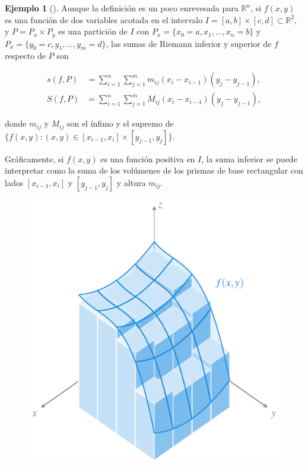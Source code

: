 \documentclass[
  a4paper,
]{scrreport}
\theoremstyle{definition}
\newtheorem{example}{Ejemplo}[chapter]
\theoremstyle{plain}
\theoremstyle{definition}
\theoremstyle{definition}
\theoremstyle{plain}
\theoremstyle{plain}
\theoremstyle{remark}
\begin{document}
\begin{example}[]
Aunque la definición es un poco enrevesada para \(\mathbb{R}^n\), si
\(f(x,y)\) es una función de dos variables acotada en el intervalo
\(I=[a,b]\times [c,d]\subset \mathbb{R}^2\), y \(P=P_x\times P_y\) es
una partición de \(I\) con \(P_x=\{x_0=a,x_1,\ldots, x_n=b\}\) y
\(P_x=\{y_0=c,y_1,\ldots, y_m=d\}\), las sumas de Riemann inferior y
superior de \(f\) respecto de \(P\) son

\begin{align*}
s(f,P) &= \sum_{i=1}^n \sum_{j=1}^m m_{ij}(x_i-x_{i-1})(y_j-y_{j-1}), \\
S(f,P) &= \sum_{i=1}^n \sum_{j=1}^m M_{ij}(x_i-x_{i-1})(y_j-y_{j-1}),
\end{align*}

donde \(m_{ij}\) y \(M_{ij}\) son el ínfimo y el supremo de
\(\{f(x,y): (x,y)\in [x_{i-1},x_i]\times [y_{j-1},y_j]\}\).

Gráficamente, si \(f(x,y)\) es una función positiva en \(I\), la suma
inferior se puede interpretar como la suma de los volúmenes de los
prismas de base rectangular con lados \([x_{i-1},x_i]\) y
\([y_{j-1},y_j]\) y altura \(m_{ij}\).

\begin{figure}[H]

{\centering \includegraphics{img/integrales-funciones-varias-variables/suma-riemann-funcion-varias-variables.pdf}

}
\end{figure}
\end{example}
\end{document}
